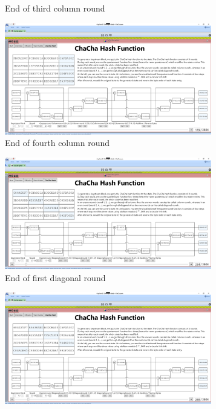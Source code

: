 \begin{figure}
\begin{subfigure}{0.5\textwidth}
  \caption{End of third column round}
  \label{fig:chachahash.cr.3}
\end{subfigure}%
\begin{subfigure}{0.5\textwidth}
  \centering
  \includegraphics[width=0.99\textwidth]{figures/ct2/chachahash/chachahash-cr4-end.png}
  \caption{End of fourth column round}
  \label{fig:chachahash.cr.4}
\end{subfigure}
\caption[End of column rounds]{End of quarterround execution of each column round of an uneven round \\(here: round 1)}
\label{fig:chachahash.cr}
\centering
\begin{subfigure}{0.5\textwidth}
  \centering
  \includegraphics[width=0.99\textwidth]{figures/ct2/chachahash/chachahash-dr1-end.png}
  \caption{End of first diagonal round}
  \label{fig:chachahash.dr.1}
\end{subfigure}%
\begin{subfigure}{0.5\textwidth}
  \centering
  \includegraphics[width=0.99\textwidth]{figures/ct2/chachahash/chachahash-dr2-end.png}

\end{subfigure}
\end{figure}
